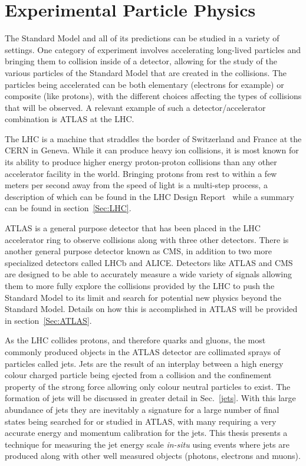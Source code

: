 \section{Experimental Particle Physics}
\label{Sec:Experi}
The Standard Model and all of its predictions can be studied in a variety of settings.  
One category of experiment involves accelerating long-lived particles and bringing them to collision inside of a detector, allowing for the study of the various particles of the Standard Model that are created in the collisions.  
The particles being accelerated can be both elementary (electrons for example) or composite (like protons), with the different choices affecting the types of collisions that will be observed.  
A relevant example of such a detector/accelerator combination is \gls{ATLAS} at the \gls{LHC}.  

The \gls{LHC} is a machine that straddles the border of Switzerland and France at the \gls{CERN} in Geneva.  
While it can produce heavy ion collisions, it is most known for its ability to produce higher energy proton-proton collisions than any other accelerator facility in the world.   
Bringing protons from rest to within a few meters per second away from the speed of light is a multi-step process, a description of which can be found in the LHC Design Report~\cite{LHCDesignReport} while a summary can be found in section~\ref{Sec:LHC}.  

\gls{ATLAS} is a general purpose detector that has been placed in the LHC accelerator ring to observe collisions along with three other detectors.  
There is another general purpose detector known as \gls{CMS}, in addition to two more specialized detectors called \gls{LHCb} and \gls{ALICE}.  
Detectors like \gls{ATLAS} and \gls{CMS} are designed to be able to accurately measure a wide variety of signals allowing them to more fully explore the collisions provided by the \gls{LHC} to push the Standard Model to its limit and search for potential new physics beyond the Standard Model.  
Details on how this is accomplished in ATLAS will be provided in section~\ref{Sec:ATLAS}.  

As the \gls{LHC} collides protons, and therefore quarks and gluons, the most commonly produced objects in the \gls{ATLAS} detector are collimated sprays of particles called jets.  
Jets are the result of an interplay between a high energy colour charged particle being ejected from a collision and the confinement property of the strong force allowing only colour neutral particles to exist.  
The formation of jets will be discussed in greater detail in Sec.~\ref{jets}.  
With this large abundance of jets they are inevitably a signature for a large number of final states being searched for or studied in ATLAS, with many requiring a very accurate energy and momentum calibration for the jets.  
This thesis presents a technique for measuring the jet energy scale \textit{in-situ} using events where jets are produced along with other well measured objects (photons, electrons and muons).  

